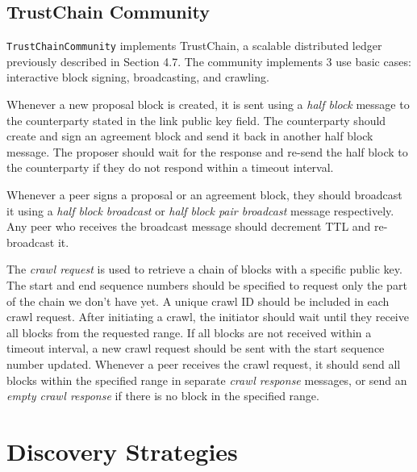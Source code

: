 \subsection{TrustChain Community}

\texttt{TrustChainCommunity} implements TrustChain, a scalable distributed ledger previously described in Section 4.7. The community implements 3 use basic cases: interactive block signing, broadcasting, and crawling.

Whenever a new proposal block is created, it is sent using a \textit{half block} message to the counterparty stated in the link public key field. The counterparty should create and sign an agreement block and send it back in another half block message. The proposer should wait for the response and re-send the half block to the counterparty if they do not respond within a timeout interval.

Whenever a peer signs a proposal or an agreement block, they should broadcast it using a \textit{half block broadcast} or \textit{half block pair broadcast} message respectively. Any peer who receives the broadcast message should decrement TTL and re-broadcast it.

The \textit{crawl request} is used to retrieve a chain of blocks with a specific public key. The start and end sequence numbers should be specified to request only the part of the chain we don't have yet. A unique crawl ID should be included in each crawl request. After initiating a crawl, the initiator should wait until they receive all blocks from the requested range. If all blocks are not received within a timeout interval, a new crawl request should be sent with the start sequence number updated. Whenever a peer receives the crawl request, it should send all blocks within the specified range in separate \textit{crawl response} messages, or send an \textit{empty crawl response} if there is no block in the specified range.





\section{Discovery Strategies}

